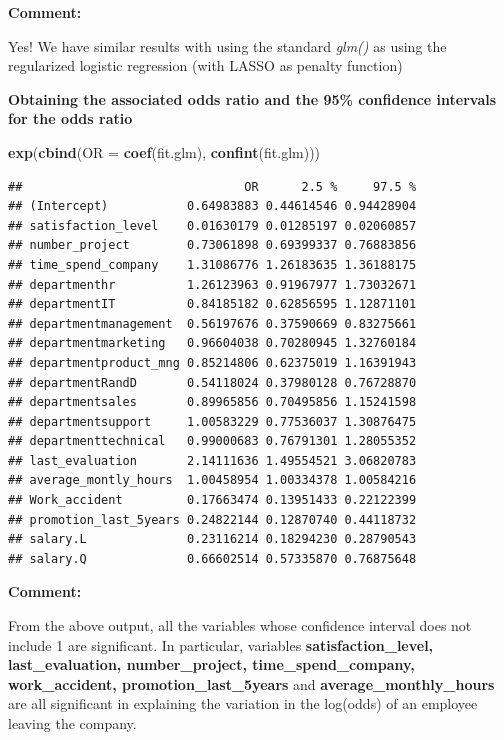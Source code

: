 \documentclass[
  11pt,
]{article}
\newenvironment{Shaded}{\begin{snugshade}}{\end{snugshade}}
\newcommand{\AttributeTok}[1]{\textcolor[rgb]{0.13,0.29,0.53}{#1}}
\newcommand{\FunctionTok}[1]{\textcolor[rgb]{0.13,0.29,0.53}{\textbf{#1}}}
\newcommand{\NormalTok}[1]{#1}
\begin{document}
\textbf{Comment:}

Yes! We have similar results with using the standard \emph{glm()} as
using the regularized logistic regression (with LASSO as penalty
function)

\hfill\break
\textbf{Obtaining the associated odds ratio and the 95\% confidence
intervals for the odds ratio}

\begin{Shaded}
\begin{Highlighting}[]
\FunctionTok{exp}\NormalTok{(}\FunctionTok{cbind}\NormalTok{(}\AttributeTok{OR =} \FunctionTok{coef}\NormalTok{(fit.glm), }\FunctionTok{confint}\NormalTok{(fit.glm)))}
\end{Highlighting}
\end{Shaded}

\begin{verbatim}
##                               OR      2.5 %     97.5 %
## (Intercept)           0.64983883 0.44614546 0.94428904
## satisfaction_level    0.01630179 0.01285197 0.02060857
## number_project        0.73061898 0.69399337 0.76883856
## time_spend_company    1.31086776 1.26183635 1.36188175
## departmenthr          1.26123963 0.91967977 1.73032671
## departmentIT          0.84185182 0.62856595 1.12871101
## departmentmanagement  0.56197676 0.37590669 0.83275661
## departmentmarketing   0.96604038 0.70280945 1.32760184
## departmentproduct_mng 0.85214806 0.62375019 1.16391943
## departmentRandD       0.54118024 0.37980128 0.76728870
## departmentsales       0.89965856 0.70495856 1.15241598
## departmentsupport     1.00583229 0.77536037 1.30876475
## departmenttechnical   0.99000683 0.76791301 1.28055352
## last_evaluation       2.14111636 1.49554521 3.06820783
## average_montly_hours  1.00458954 1.00334378 1.00584216
## Work_accident         0.17663474 0.13951433 0.22122399
## promotion_last_5years 0.24822144 0.12870740 0.44118732
## salary.L              0.23116214 0.18294230 0.28790543
## salary.Q              0.66602514 0.57335870 0.76875648
\end{verbatim}

\textbf{Comment:}

From the above output, all the variables whose confidence interval does
not include 1 are significant. In particular, variables
\textbf{satisfaction\_level, last\_evaluation, number\_project,
time\_spend\_company, work\_accident, promotion\_last\_5years} and
\textbf{average\_monthly\_hours} are all significant in explaining the
variation in the log(odds) of an employee leaving the company.
\end{document}
